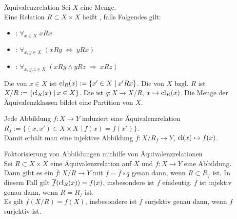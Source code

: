 \begin{Def}{Äquivalenzrelation}
    Sei $X$ eine Menge. \\
    Eine Relation $R \subset X \times X$ heißt ,
    falls Folgendes gilt:
    \begin{itemize}
        \item
        :
        $\forall_{x \in X}\; xRx$
        
        \item
        :
        $\forall_{x, y \in X}\; (xRy \;\Leftrightarrow\; yRx)$
        
        \item
        :
        $\forall_{x, y, z \in X}\; (xRy \land yRz \;\Rightarrow\; xRz)$
    \end{itemize}
    Die  von $x \in X$ ist
    $\operatorname{cl}_R(x) := \{x' \in X \;|\; x'Rx\}$.
    Die  von $X$ bzgl. $R$ ist
    $X/R := \{\operatorname{cl}_R(x) \;|\; x \in X\}$.
    Die  ist
    $q\colon X \rightarrow X/R$, $x \mapsto \operatorname{cl}_R(x)$.
    Die Menge der Äquivalenzklassen bildet eine Partition von $X$.
\end{Def}

\begin{Bem}
    Jede Abbildung $f\colon X \rightarrow Y$ induziert eine
    Äquivalenzrelation \\
    $R_f := \{(x, x') \in X \times X \;|\; f(x) = f(x')\}$. \\
    Damit erhält man eine injektive Abbildung
    $\overline{f}\colon X/R_f \rightarrow Y$, $\operatorname{cl}(x) \mapsto f(x)$.
\end{Bem}

\begin{Lemma}{Faktorisierung von Abbildungen mithilfe von
              Äquivalenzrelationen}\\
    Sei $R \subset X \times X$ eine Äquivalenzrelation auf $X$ und
    $f\colon X \rightarrow Y$ eine Abbildung.
    Dann gibt es ein $\overline{f}\colon X/R \rightarrow Y$ mit
    $f = \overline{f} \circ q$ genau dann, wenn $R \subset R_f$ ist.
    In diesem Fall gilt $\overline{f}(\operatorname{cl}_R(x)) = f(x)$, insbesondere ist
    $\overline{f}$ eindeutig.
    $\overline{f}$ ist injektiv genau dann, wenn $R = R_f$ ist. \\
    Es gilt $\overline{f}(X/R) = f(X)$, insbesondere ist
    $\overline{f}$ surjektiv genau dann, wenn $f$ surjektiv ist.
\end{Lemma}

